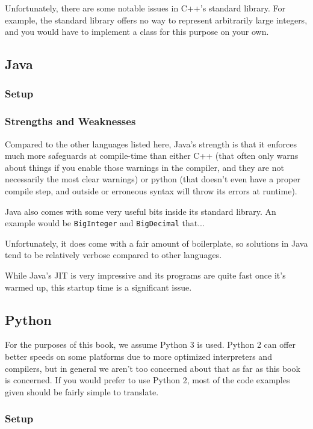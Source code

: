 Unfortunately, there are some notable issues in C++'s standard library. For example, the standard library offers no way to represent arbitrarily large integers, and you would have to implement a class for this purpose on your own.

\subsection{Java}
\subsubsection{Setup}

\subsubsection{Strengths and Weaknesses}

Compared to the other languages listed here, Java's strength is that it enforces much more safeguards at compile-time than either C++ (that often only warns about things if you enable those warnings in the compiler, and they are not necessarily the most clear warnings) or python (that doesn't even have a proper compile step, and outside or erroneous syntax will throw its errors at runtime).

Java also comes with some very useful bits inside its standard library. An example would be \texttt{BigInteger} and \texttt{BigDecimal} that...

Unfortunately, it does come with a fair amount of boilerplate, so solutions in Java tend to be relatively verbose compared to other languages.

While Java's JIT is very impressive and its programs are quite fast once it's warmed up, this startup time is a significant issue.

\subsection{Python}

For the purposes of this book, we assume Python 3 is used. Python 2 can offer better speeds on some platforms due to more optimized interpreters and compilers, but in general we aren't too concerned about that as far as this book is concerned. If you would prefer to use Python 2, most of the code examples given should be fairly simple to translate.

\subsubsection{Setup}
